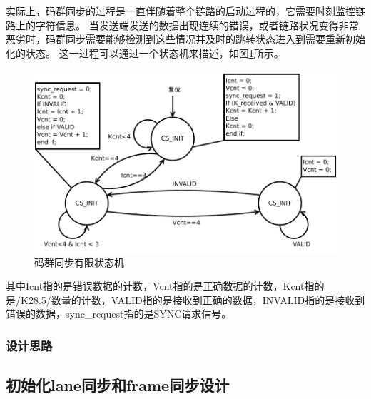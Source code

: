 \documentclass[UTF8]{ctexart}
\begin{document}
实际上，码群同步的过程是一直伴随着整个链路的启动过程的，它需要时刻监控链路上的字符信息。
当发送端发送的数据出现连续的错误，或者链路状况变得非常恶劣时，码群同步需要能够检测到这些情况并及时的跳转状态进入到需要重新初始化的状态。
这一过程可以通过一个状态机来描述，如图\ref{fig:cgs_fsm}所示。

\begin{figure}[H]
\centering
\includegraphics[width=18cm]{./img/cgs_fsm.pdf}
\caption{码群同步有限状态机}
\label{fig:cgs_fsm}
\end{figure}

其中Icnt指的是错误数据的计数，Vcnt指的是正确数据的计数，Kcnt指的是/K28.5/数量的计数，VALID指的是接收到正确的数据，INVALID指的是接收到错误的数据，sync_request指的是SYNC请求信号。

\subsubsection{设计思路}

\subsection{初始化lane同步和frame同步设计}


\end{document}
